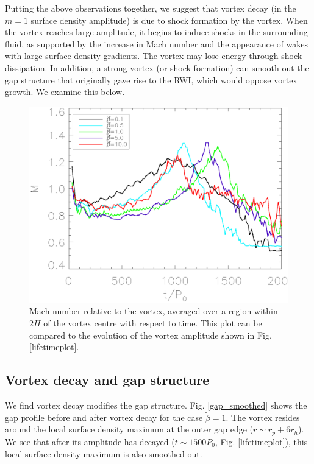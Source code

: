 Putting the above observations together, we suggest that vortex decay
(in the $m=1$ surface density amplitude) is due to shock formation by
the vortex. When the vortex reaches large amplitude, it begins
to induce shocks in the surrounding fluid, as supported by the
increase in Mach number and the appearance of wakes with large surface
density gradients. The vortex may lose energy through shock
dissipation. In addition, a strong vortex (or shock formation) 
can smooth out the gap structure that originally gave rise to the
RWI, which would oppose vortex growth. We examine this below.

\begin{figure}
  \includegraphics[width=\linewidth]{figures/mach}
  \caption{Mach number relative to
    the vortex, averaged over a region within $2H$ of the  
    vortex centre with respect to time. This plot can be compared to the evolution of the
    vortex amplitude shown in Fig. \ref{lifetimeplot}.
    \label{machplot}}
\end{figure}

\subsection{Vortex decay and gap structure}  
We find vortex decay modifies the gap
structure. Fig. \ref{gap_smoothed} shows the gap profile before and
after vortex decay for the case $\tilde{\beta}=1$. The vortex resides
around the local surface density maximum at the outer gap edge ($r\sim r_p +
6r_h$). We see that after its amplitude has decayed ($t\sim1500P_0$,   
Fig. \ref{lifetimeplot}), this local surface density maximum is also 
smoothed out.

